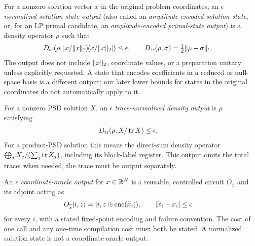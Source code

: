 \begin{definition}
\label{def:solution-state-output}
For a nonzero solution vector $x$ in the original problem coordinates, an
\emph{$\epsilon$ normalized solution-state output} (also called an
\emph{amplitude-encoded solution state}, or, for an LP primal candidate, an
\emph{amplitude-encoded primal-state output}) is a density operator $\rho$ such that
\begin{equation}
 D_{\mathrm{tr}}\!\left(\rho,
 \lvert x/\lVert x\rVert_2\rangle\!\langle x/\lVert x\rVert_2\rvert\right)\leq\epsilon,
 \qquad
 D_{\mathrm{tr}}(\rho,\sigma)=\tfrac12\lVert\rho-\sigma\rVert_1.
 \label{eq:solution-state-output}
\end{equation}
The output does not include $\lVert x\rVert_2$, coordinate values, or a preparation
unitary unless explicitly requested.  A state that encodes coefficients in a reduced or
null-space basis is a different output; our later lower bounds for states in
the original coordinates do not automatically apply to it.
\end{definition}

\begin{definition}
\label{def:trace-density-output}
For a nonzero PSD solution $X$, an \emph{$\epsilon$ trace-normalized density
output} is $\rho$ satisfying
\begin{equation}
 D_{\mathrm{tr}}\!\left(\rho,X/\operatorname{tr} X\right)\leq\epsilon.
 \label{eq:trace-density-output}
\end{equation}
For a product-PSD solution this means the direct-sum density operator
$\bigoplus_jX_j/(\sum_j\operatorname{tr} X_j)$, including its block-label register.  This
output omits the total trace; when needed, the trace must be output
separately.
\end{definition}

\begin{definition}
\label{def:coordinate-oracle-output}
An \emph{$\epsilon$ coordinate-oracle output} for $x\in\mathbb{R}^N$ is a reusable,
controlled circuit $O_{\widetilde x}$ and its adjoint acting as
\begin{equation}
 O_{\widetilde x}\lvert i,z\rangle
 =\lvert i,z\mathbin\oplus\operatorname{enc}(\widetilde x_i)\rangle,
 \qquad |\widetilde x_i-x_i|\leq\epsilon
 \label{eq:coordinate-oracle-output}
\end{equation}
for every $i$, with a stated fixed-point encoding and failure convention.
The cost of one call and any one-time compilation cost must both be
stated.  A normalized solution state is not a coordinate-oracle output.
\end{definition}

